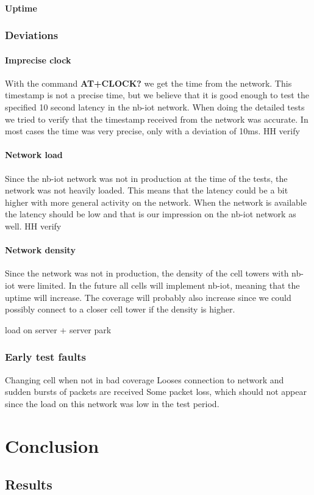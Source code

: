 \documentclass[USenglish]{ifimaster}  %
\begin{document}
\subsection{Uptime}

\section{Deviations} \label{section:deviations}
\subsection{Imprecise clock}
With the command \textbf{AT+CLOCK?} we get the time from the network. This timestamp is not a precise time, but we believe that it is good enough to test the specified 10 second latency in the \acrshort{nb-iot} network. When doing the detailed tests we tried to verify that the timestamp received from the network was accurate. In most cases the time was very precise, only with a deviation of 10ms. HH verify

\subsection{Network load}
Since the \acrshort{nb-iot} network was not in production at the time of the tests, the network was not heavily loaded. This means that the latency could be a bit higher with more general activity on the network. When the network is available the latency should be low and that is our impression on the \acrshort{nb-iot} network as well. HH verify

\subsection{Network density}
Since the network was not in production, the density of the cell towers with \acrshort{nb-iot} were limited. In the future all cells will implement \acrshort{nb-iot}, meaning that the uptime will increase. The coverage will probably also increase since we could possibly connect to a closer cell tower if the density is higher.

load on server + server park

\section{Early test faults}
Changing cell when not in bad coverage
Looses connection to network and sudden bursts of packets are received
Some packet loss, which should not appear since the load on this network was low in the test period.


\part{Conclusion}                     %

\chapter{Results}                     %


\backmatter{}
\printbibliography
\printglossary[type=\acronymtype]
\end{document}
